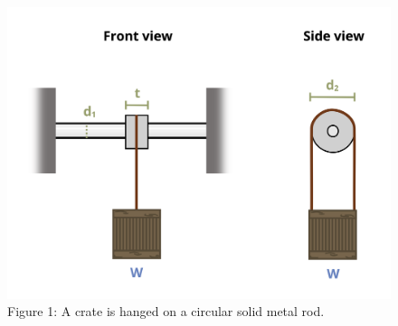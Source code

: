 \documentclass[
  letterpaper,
  DIV=11,
  numbers=noendperiod]{scrreprt}
\begin{document}
\begin{figure}[H]

{\centering \includegraphics{images/166.png}

}

\caption{Figure 1: A crate is hanged on a circular solid metal rod.}

\end{figure}%
\end{document}
